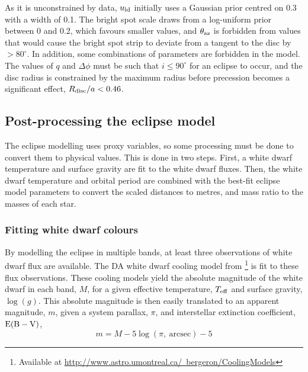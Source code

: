 As it is unconstrained by data, $u_{\rm ld}$ initially uses a Gaussian prior centred on 0.3 with a width of 0.1.
The bright spot scale draws from a log-uniform prior between 0 and 0.2, which favours smaller values, and $\theta_{\rm az}$ is forbidden from values that would cause the bright spot strip to deviate from a tangent to the disc by $>80^\circ$.
In addition, some combinations of parameters are forbidden in the model. The values of $q$ and $\Delta\phi$ must be such that $i \leq 90^\circ$ for an eclipse to occur, and the disc radius is constrained by the maximum radius before precession becomes a significant effect, $R_{\rm disc} / a < 0.46$.


\subsection{Post-processing the eclipse model}
\label{sect:modelling:post processing the eclipse model}

The eclipse modelling uses proxy variables, so some processing must be done to convert them to physical values. This is done in two steps. First, a white dwarf temperature and surface gravity are fit to the white dwarf fluxes. Then, the white dwarf temperature and orbital period are combined with the best-fit eclipse model parameters to convert the scaled distances to metres, and mass ratio to the masses of each star.

\subsubsection{Fitting white dwarf colours}
\label{sect:modelling:fitting white dwarf colours}
By modelling the eclipse in multiple bands, at least three observations of white dwarf flux are available.
The DA white dwarf cooling model from \citet{Bergeron1995}\footnote{Available at \href{http://www.astro.umontreal.ca/~bergeron/CoolingModels}{http://www.astro.umontreal.ca/~bergeron/CoolingModels}} is fit to these flux observations.
These cooling models yield the absolute magnitude of the white dwarf in each band, $M$, for a given effective temperature, $T_{\rm eff}$ and surface gravity, $\log (g)$. This absolute magnitude is then easily translated to an apparent magnitude, $m$, given a system parallax, $\pi$, and interstellar extinction coefficient, ${\rm E(B-V)}$,
\begin{equation}
    m = M - 5\log (\pi\mathrm{,\ arcsec}) - 5
\end{equation}

